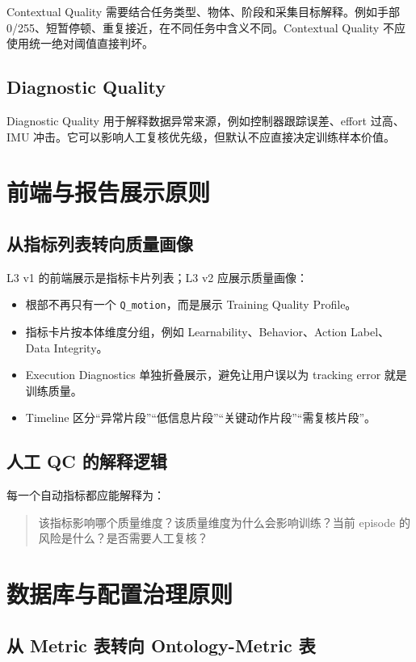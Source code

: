 \documentclass[UTF8,zihao=-4]{ctexart}
\newcommand{\Code}[1]{\texttt{#1}}
\begin{document}
Contextual Quality 需要结合任务类型、物体、阶段和采集目标解释。例如手部 0/255、短暂停顿、重复接近，在不同任务中含义不同。Contextual Quality 不应使用统一绝对阈值直接判坏。

\subsection{Diagnostic Quality}

Diagnostic Quality 用于解释数据异常来源，例如控制器跟踪误差、effort 过高、IMU 冲击。它可以影响人工复核优先级，但默认不应直接决定训练样本价值。

\section{前端与报告展示原则}

\subsection{从指标列表转向质量画像}

L3 v1 的前端展示是指标卡片列表；L3 v2 应展示质量画像：
\begin{itemize}
  \item 根部不再只有一个 \Code{Q\_motion}，而是展示 Training Quality Profile。
  \item 指标卡片按本体维度分组，例如 Learnability、Behavior、Action Label、Data Integrity。
  \item Execution Diagnostics 单独折叠展示，避免让用户误以为 tracking error 就是训练质量。
  \item Timeline 区分“异常片段”“低信息片段”“关键动作片段”“需复核片段”。
\end{itemize}

\subsection{人工 QC 的解释逻辑}

每一个自动指标都应能解释为：
\begin{quote}
该指标影响哪个质量维度？该质量维度为什么会影响训练？当前 episode 的风险是什么？是否需要人工复核？
\end{quote}

\section{数据库与配置治理原则}

\subsection{从 Metric 表转向 Ontology-Metric 表}
\end{document}
